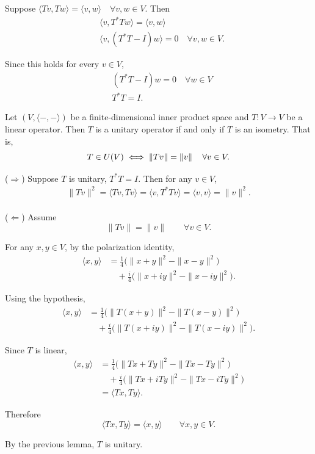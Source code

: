 \begin{pfbox}
Suppose $\langle Tv,Tw\rangle = \langle v,w\rangle
\quad \forall v,w\in V$.
Then
\begin{align*}
& \langle v,T^*Tw\rangle = \langle v,w\rangle\\
& \langle v,(T^*T-I)w\rangle=0 \quad \forall v,w\in V.
\end{align*}

Since this holds for every $v\in V$,
\begin{align*}
    &(T^*T-I)w=0 \quad \forall w\in V \\ 
    & T^*T=I.
\end{align*}
\end{pfbox}




\begin{theorem}
    Let $(V,\langle-,-\rangle)$ be a finite-dimensional inner product space and $T: V \to V$ be a linear operator. 
    Then $T$ is a unitary operator if and only if $T$ is an isometry. That is,
    $$ T \in U(V) \iff \left\lVert Tv \right\rVert = \left\lVert v \right\rVert \quad \forall v \in V. $$
\end{theorem}

\begin{pfbox}
($\Rightarrow$) Suppose $T$ is unitary, $T^*T=I$. Then for any $v\in V$,
\begin{align*}
\|Tv\|^2 =\langle Tv,Tv\rangle =\langle v,T^*Tv\rangle =\langle v,v\rangle =\|v\|^2.
\end{align*}\\
($\Leftarrow$)
Assume
\[
\|Tv\|=\|v\|
\qquad \forall v\in V.
\]

For any $x,y\in V$, by the polarization identity,
\begin{align*}
\langle x,y\rangle
&=
\frac14\Big(
\|x+y\|^2-\|x-y\|^2
\Big)  \\
&\quad
+\frac{i}{4}
\Big(
\|x+iy\|^2-\|x-iy\|^2
\Big).
\end{align*}

Using the hypothesis,
\begin{align*}
\langle x,y\rangle
&=
\frac14
\Big(
\|T(x+y)\|^2
-
\|T(x-y)\|^2
\Big) \\
&\quad
+\frac{i}{4}
\Big(
\|T(x+iy)\|^2
-
\|T(x-iy)\|^2
\Big).
\end{align*}

Since $T$ is linear,
\begin{align*}
\langle x,y\rangle
&=
\frac14
\Big(
\|Tx+Ty\|^2
-
\|Tx-Ty\|^2
\Big) \\
&\quad
+\frac{i}{4}
\Big(
\|Tx+iTy\|^2
-
\|Tx-iTy\|^2
\Big) \\
&=
\langle Tx,Ty\rangle.
\end{align*}

Therefore
\[
\langle Tx,Ty\rangle
=
\langle x,y\rangle
\qquad \forall x,y\in V.
\]

By the previous lemma, $T$ is unitary.
\end{pfbox}

